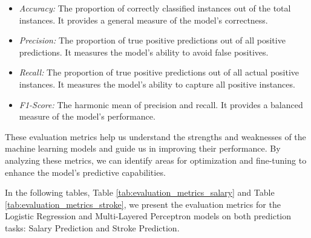 \documentclass[runningheads]{paper}
\begin{document}
\begin{itemize}
    \item \textit{Accuracy:} The proportion of correctly classified instances
    out of the total instances. It provides a general measure of the model's
    correctness.
    \item \textit{Precision:} The proportion of true positive predictions out
    of all positive predictions. It measures the model's ability to avoid false
    positives.
    \item \textit{Recall:} The proportion of true positive predictions out of
    all actual positive instances. It measures the model's ability to capture
    all positive instances.
    \item \textit{F1-Score:} The harmonic mean of precision and recall. It provides
    a balanced measure of the model's performance.
\end{itemize}

These evaluation metrics help us understand the strengths and weaknesses of the
machine learning models and guide us in improving their performance. By analyzing
these metrics, we can identify areas for optimization and fine-tuning to enhance
the model's predictive capabilities.

In the following tables, Table \ref{tab:evaluation_metrics_salary} and Table
\ref{tab:evaluation_metrics_stroke}, we present the evaluation metrics for the 
Logistic Regression
and Multi-Layered Perceptron models on both prediction tasks: Salary Prediction and
Stroke Prediction.
\end{document}
